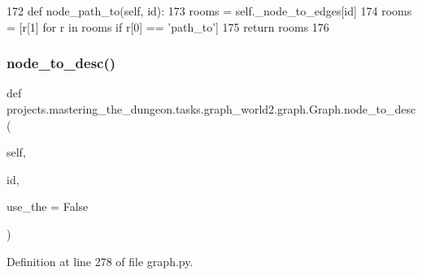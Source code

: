 \begin{DoxyCode}
172     \textcolor{keyword}{def }node\_path\_to(self, id):
173         rooms = self.\_node\_to\_edges[id]
174         rooms = [r[1] \textcolor{keywordflow}{for} r \textcolor{keywordflow}{in} rooms \textcolor{keywordflow}{if} r[0] == \textcolor{stringliteral}{'path\_to'}]
175         \textcolor{keywordflow}{return} rooms
176 
\end{DoxyCode}
\mbox{\label{classprojects_1_1mastering__the__dungeon_1_1tasks_1_1graph__world2_1_1graph_1_1Graph_a6e3ed011d27b7469311a3f0c43ef9ae7}} 
\subsubsection{\texorpdfstring{node\+\_\+to\+\_\+desc()}{node\_to\_desc()}}
{\footnotesize\ttfamily def projects.\+mastering\+\_\+the\+\_\+dungeon.\+tasks.\+graph\+\_\+world2.\+graph.\+Graph.\+node\+\_\+to\+\_\+desc (\begin{DoxyParamCaption}\item[{}]{self,  }\item[{}]{id,  }\item[{}]{use\+\_\+the = {\ttfamily False} }\end{DoxyParamCaption})}



Definition at line 278 of file graph.\+py.


